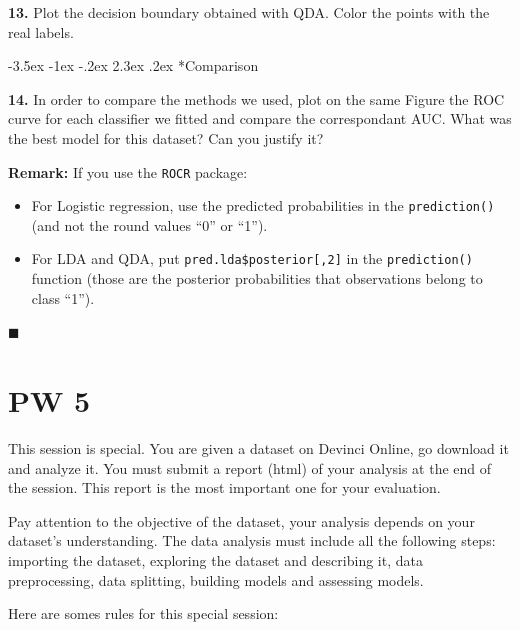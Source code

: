 \documentclass[]{book}
\makeatletter
\providecommand{\tightlist}{%
  \setlength{\itemsep}{0pt}\setlength{\parskip}{0pt}}
\renewcommand\section{\@startsection {section}{1}{\z@}%
                                   {-3.5ex \@plus -1ex \@minus -.2ex}%
                                   {2.3ex \@plus.2ex}%
                                   {\normalfont\Large\bfseries\color{ForestGreen}}}
\theoremstyle{definition}
\theoremstyle{definition}
\theoremstyle{definition}
\theoremstyle{remark}
\makeatother
\begin{document}
\textbf{13.} Plot the decision boundary obtained with QDA. Color the
points with the real labels.

\section*{Comparison}\label{comparison}

\textbf{14.} In order to compare the methods we used, plot on the same
Figure the ROC curve for each classifier we fitted and compare the
correspondant AUC. What was the best model for this dataset? Can you
justify it?

\textbf{Remark:} If you use the \texttt{ROCR} package:

\begin{itemize}
\tightlist
\item
  For Logistic regression, use the predicted probabilities in the
  \texttt{prediction()} (and not the round values ``0'' or ``1'').
\item
  For LDA and QDA, put \texttt{pred.lda\$posterior{[},2{]}} in the
  \texttt{prediction()} function (those are the posterior probabilities
  that observations belong to class ``1'').
\end{itemize}

◼

\chapter*{PW 5}\label{pw-5}

This session is special. You are given a dataset on Devinci Online, go
download it and analyze it. You must submit a report (html) of your
analysis at the end of the session. This report is the most important
one for your evaluation.

Pay attention to the objective of the dataset, your analysis depends on
your dataset's understanding. The data analysis must include all the
following steps: importing the dataset, exploring the dataset and
describing it, data preprocessing, data splitting, building models and
assessing models.

Here are somes rules for this special session:
\end{document}
